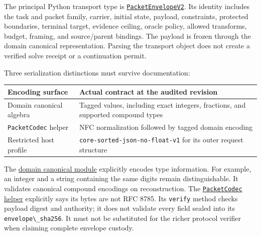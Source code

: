 \documentclass[
  11pt,
]{article}
\newcommand{\passthrough}[1]{#1}
\begin{document}
The principal Python transport type is
\href{https://github.com/dbccpage/the_symbol_game/blob/52cb5457f6c485ba548cfd292f6012a941ed22cf/symbol_game/domain/entities/packet_envelope.py}{\passthrough{\lstinline!PacketEnvelopeV2!}}.
Its identity includes the task and packet family, carrier, initial
state, payload, constraints, protected boundaries, terminal target,
evidence ceiling, oracle policy, allowed transforms, budget, framing,
and source/parent bindings. The payload is frozen through the domain
canonical representation. Parsing the transport object does not create a
verified solve receipt or a continuation permit.

Three serialization distinctions must survive documentation:

\begin{longtable}[]{@{}
  >{\raggedright\arraybackslash}p{}
  >{\raggedright\arraybackslash}p{}@{}}
\toprule\noalign{}
\begin{minipage}[b]{\linewidth}\raggedright
Encoding surface
\end{minipage} & \begin{minipage}[b]{\linewidth}\raggedright
Actual contract at the audited revision
\end{minipage} \\
\midrule\noalign{}
\endhead
\bottomrule\noalign{}
\endlastfoot
Domain canonical algebra & Tagged values, including exact integers,
fractions, and supported compound types \\
\passthrough{\lstinline!PacketCodec!} helper & NFC normalization
followed by tagged domain encoding \\
Restricted host profile &
\passthrough{\lstinline!core-sorted-json-no-float-v1!} for its outer
request structure \\
\end{longtable}

The
\href{https://github.com/dbccpage/the_symbol_game/blob/52cb5457f6c485ba548cfd292f6012a941ed22cf/symbol_game/domain/shared_kernel/canonical.py}{domain
canonical module} explicitly encodes type information. For example, an
integer and a string containing the same digits remain distinguishable.
It validates canonical compound encodings on reconstruction. The
\href{https://github.com/dbccpage/the_symbol_game/blob/52cb5457f6c485ba548cfd292f6012a941ed22cf/symbol_game/domain/packet_codec.py}{\passthrough{\lstinline!PacketCodec!}
helper} explicitly says its bytes are not RFC 8785. Its
\passthrough{\lstinline!verify!} method checks payload digest and
authority; it does not validate every field sealed into its
\passthrough{\lstinline!envelope\_sha256!}. It must not be substituted
for the richer protocol verifier when claiming complete envelope
custody.
\end{document}
